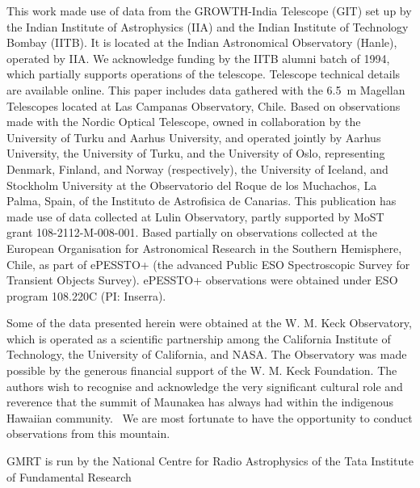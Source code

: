 \documentclass{nature_plusfigure}
\begin{document}
\begin{addendum}
This work made use of data from the GROWTH-India Telescope (GIT) set up by the Indian Institute of Astrophysics (IIA) and the Indian Institute of Technology Bombay (IITB). It is located at the Indian Astronomical Observatory (Hanle), operated by IIA. We acknowledge funding by the IITB alumni batch of 1994, which partially supports operations of the telescope. Telescope technical details are available online.\cite{growth_india}
%
This paper includes data gathered with the 6.5~m Magellan Telescopes located at Las Campanas Observatory, Chile.
%
Based on observations made with the Nordic Optical Telescope, owned in collaboration by the University of Turku and Aarhus University, and operated jointly by Aarhus University, the University of Turku, and the University of Oslo, representing Denmark, Finland, and Norway (respectively), the University of Iceland, and Stockholm University at the Observatorio del Roque de los Muchachos, La Palma, Spain, of the Instituto de Astrofisica de Canarias.
%
This publication has made use of data collected at Lulin Observatory, partly supported by MoST grant 108-2112-M-008-001.
%
Based partially on observations collected at the European Organisation for Astronomical Research in the Southern Hemisphere, Chile, as part of ePESSTO+ (the advanced Public ESO Spectroscopic Survey for Transient Objects Survey).
ePESSTO+ observations were obtained under ESO program 108.220C (PI: Inserra).


Some of the data presented herein were obtained at the W. M. Keck Observatory, which is operated as a scientific partnership among the California Institute of Technology, the University of California, and NASA. The Observatory was made possible by the generous financial support of the W. M. Keck Foundation.
The authors wish to recognise and acknowledge the very significant cultural role and reverence that the summit of Maunakea has always had within the indigenous Hawaiian community.  We are most fortunate to have the opportunity to conduct observations from this mountain.

GMRT is run by the National Centre for Radio Astrophysics of the Tata Institute of Fundamental Research


\end{addendum}
\end{document}
